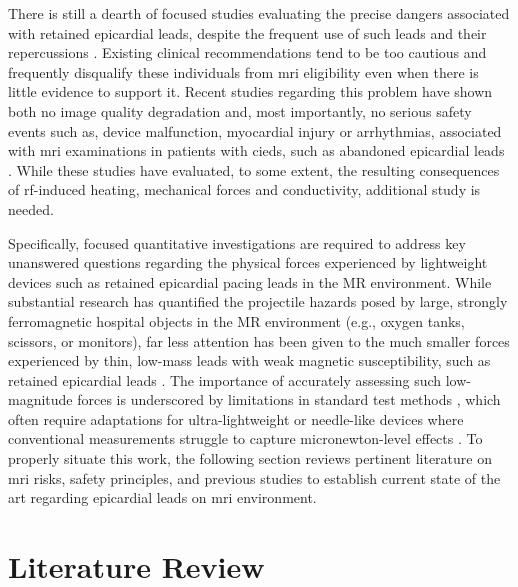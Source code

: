 There is still a dearth of focused studies evaluating the precise dangers associated with retained epicardial leads, despite the frequent use of such leads and their repercussions \cite{Hartnell_AJR_1997, meier2024, mrisafety_286}. Existing clinical recommendations tend to be too cautious and frequently disqualify these individuals from \gls{mri} eligibility even when there is little evidence to support it. Recent studies regarding this problem have shown both no image quality degradation and, most importantly, no serious safety events such as, device malfunction, myocardial injury or arrhythmias, associated with \gls{mri} examinations in patients with \glspl{cied}, such as abandoned epicardial leads \cite{meier2024,vuorinen2021}. While these studies have evaluated, to some extent, the resulting consequences of \gls{rf}-induced heating, mechanical forces and conductivity, additional study is needed. 


Specifically, focused quantitative investigations are required to address key unanswered questions regarding the physical forces experienced by lightweight devices such as retained epicardial pacing leads in the MR environment. While substantial research has quantified the projectile hazards posed by large, strongly ferromagnetic hospital objects in the MR environment (e.g., oxygen tanks, scissors, or monitors), far less attention has been given to the much smaller forces experienced by thin, low-mass leads with weak magnetic susceptibility, such as retained epicardial leads \cite{panych2018,Grainger_MHRA_2014,Delnoa2019}. The importance of accurately assessing such low-magnitude forces is underscored by limitations in standard test methods \cite{astmF2052,astm2213}, which often require adaptations for ultra-lightweight or needle-like devices where conventional measurements struggle to capture micronewton-level effects \cite{stoianovici2024}. To properly situate this work, the following section reviews pertinent literature on \gls{mri} risks, safety principles, and previous studies to establish current state of the art regarding epicardial leads on \gls{mri} environment.
 
 \section{Literature Review}
 \label{sec:LitRev}
 
 
 


